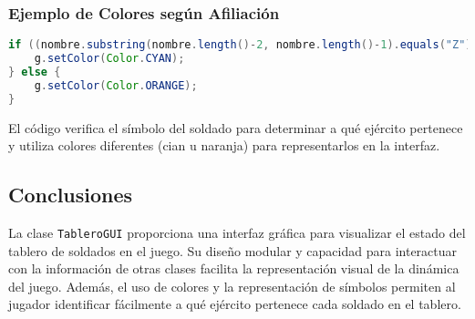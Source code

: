\subsubsection{Ejemplo de Colores según Afiliación}
\begin{lstlisting}[language=Java]
if ((nombre.substring(nombre.length()-2, nombre.length()-1).equals("Z"))) {
    g.setColor(Color.CYAN);
} else {
    g.setColor(Color.ORANGE);
}
\end{lstlisting}
El código verifica el símbolo del soldado para determinar a qué ejército pertenece y utiliza colores diferentes (cian u naranja) para representarlos en la interfaz.

\subsection{Conclusiones}

La clase \texttt{TableroGUI} proporciona una interfaz gráfica para visualizar el estado del tablero de soldados en el juego. Su diseño modular y capacidad para interactuar con la información de otras clases facilita la representación visual de la dinámica del juego. Además, el uso de colores y la representación de símbolos permiten al jugador identificar fácilmente a qué ejército pertenece cada soldado en el tablero.
